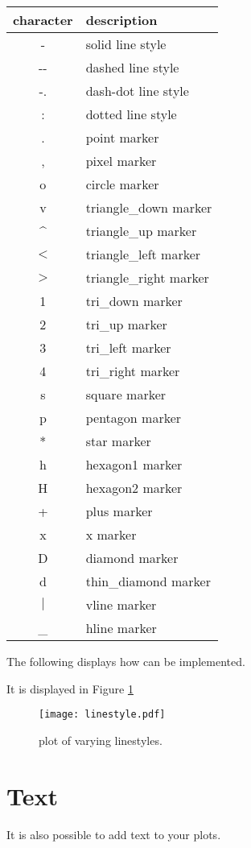 \begin{tabular}
{|c||l|}
\hline
character & description \\
\hline
- & solid line style \\
-{}- & dashed line style\\
-. & dash-dot line style \\
: & dotted line style \\
. & point marker \\
, & pixel marker \\
o & circle marker \\
v & triangle\_down marker \\
\^{} & triangle\_up marker \\
$<$ & triangle\_left marker \\
$>$ & triangle\_right marker \\
1 & tri\_down marker \\
2 & tri\_up marker \\
3 & tri\_left marker \\
4 & tri\_right marker \\
s & square marker \\
p & pentagon marker \\
* & star marker \\
h & hexagon1 marker \\
H & hexagon2 marker \\
+ & plus marker \\
x & x marker \\
D & diamond marker \\
d & thin\_diamond marker \\
$|$ & vline marker \\
\_{} & hline marker \\
\hline 
\end{tabular}


The following displays how  can be implemented. 

It is displayed in Figure \ref{linestyle}


\begin{figure} 
\texttt{[image: linestyle.pdf]}
\caption{plot of varying linestyles.}
\label{linestyle} 
\end{figure}


\section*{Text}
It is also possible to add text to your plots. 

